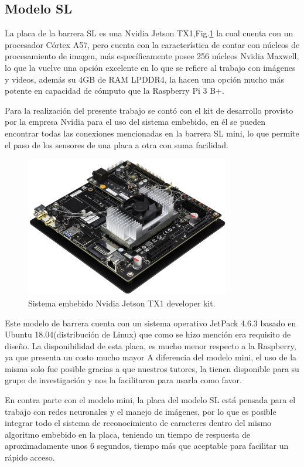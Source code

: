 \subsection{Modelo SL}
La placa de la barrera SL es una Nvidia Jetson TX1,Fig.\ref{fig:JTX1} la cual cuenta con un procesador Córtex A57, pero
cuenta con la característica de contar con núcleos de procesamiento de imagen, más específicamente posee 256 núcleos Nvidia Maxwell,
lo que la vuelve una opción excelente en lo que se refiere al trabajo con imágenes y videos, además su 4GB de RAM LPDDR4,
la hacen una opción mucho más potente en capacidad de cómputo que la Raspberry Pi 3 B+.


Para la realización del presente trabajo se contó con el kit de desarrollo provisto por la empresa Nvidia para el uso
del sistema embebido, en él se pueden encontrar todas las conexiones mencionadas en la barrera SL mini, lo que permite
el paso de los sensores de una placa a otra con suma facilidad.

\begin{figure}
    \centering
    \includegraphics[width=0.8\textwidth]{imgs/JTX1-developerkit.png}
    \caption{Sistema embebido Nvidia Jetson TX1 developer kit.}
    \label{fig:JTX1}
\end{figure}
Este modelo de barrera cuenta con un sistema operativo JetPack 4.6.3 basado en Ubuntu 18.04(distribución de Linux) que 
como se hizo mención era requisito de diseño.
La disponibilidad de esta placa, es mucho menor respecto a la Raspberry, ya que presenta un costo mucho mayor 
A diferencia del modelo mini, el uso de la misma solo fue posible gracias a que nuestros tutores, la tienen disponible 
para su grupo de investigación y nos la facilitaron para usarla como favor.

En contra parte con el modelo mini, la placa del modelo SL está pensada para el trabajo con redes neuronales y el manejo 
de imágenes, por lo que es posible integrar todo el sistema de reconocimiento de caracteres dentro del mismo algoritmo embebido 
en la placa, teniendo un tiempo de respuesta de aproximadamente unos 6 segundos, tiempo más que aceptable para facilitar un rápido
acceso.

